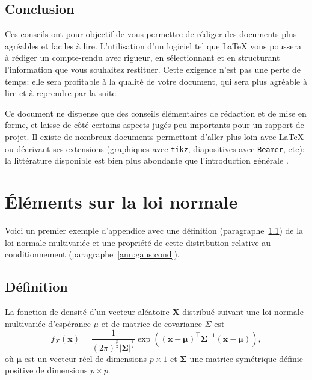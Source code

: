 \documentclass[twocolumn,10pt]{article}
\newcommand{\bsx}{\boldsymbol{x}}
\newcommand{\bsX}{\boldsymbol{X}}
\newcommand{\bsmu}{\boldsymbol{\mu}}
\newcommand{\bsSig}{\boldsymbol{\Sigma}}
\newcommand{\transp}[1]{{#1}^\top}
\begin{document}

\subsection{Conclusion}\label{subsec:CR:conclusion}

Ces conseils ont pour objectif de vous permettre de rédiger des documents plus agréables et faciles à lire. L'utilisation d'un logiciel tel que \LaTeX{} vous poussera à rédiger un compte-rendu avec rigueur, en sélectionnant et en structurant l'information que vous souhaitez restituer. Cette exigence n'est pas une perte de temps: elle sera profitable à la qualité de votre document, qui sera plus agréable à lire et à reprendre par la suite. 

Ce document ne dispense que des conseils élémentaires de rédaction et de mise en forme, et laisse de côté certains aspects jugés peu importants pour un rapport de projet. 
Il existe de nombreux documents permettant d'aller plus loin avec \LaTeX{} ou décrivant ses extensions (graphiques avec \verb?tikz?, diapositives avec \verb?Beamer?, etc): la littérature disponible est bien plus abondante que l'introduction générale \cite{oetiker18}. 




\appendix %

\section{\'Eléments sur la loi normale}\label{ann:gaus}

Voici un premier exemple d'appendice avec une définition (paragraphe~\ref{ann:gaus:def}) de la loi normale multivariée et une propriété de cette distribution relative au conditionnement (paragraphe~\ref{ann:gaus:cond}). 

\subsection{Définition}\label{ann:gaus:def}

La fonction de densité d'un vecteur aléatoire $\bsX$ distribué suivant une loi normale multivariée d'espérance $\mu$ et de matrice de covariance $\Sigma$ est \cite{petersen12} 
\begin{equation}
\displaystyle f_X(\bsx) = \frac{1}{(2\pi)^{\frac{p}{2}}|\bsSig|^{\frac{1}{2}}} \exp \left( \transp{(\bsx-\bsmu)} \bsSig^{-1} (\bsx-\bsmu) \right) , 
\end{equation}
où $\bsmu$ est un vecteur réel de dimensions $p \times 1$ et $\bsSig$ une matrice symétrique définie-positive de dimensions $p \times p$. 
\end{document}
